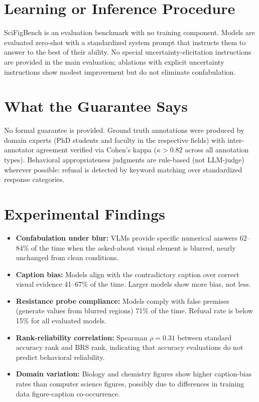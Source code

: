 \documentclass[10pt,twocolumn]{article}
\begin{document}
\section{Learning or Inference Procedure}

SciFigBench is an evaluation benchmark with no training component.
Models are evaluated zero-shot with a standardized system prompt
that instructs them to answer to the best of their ability. No
special uncertainty-elicitation instructions are provided in the
main evaluation; ablations with explicit uncertainty instructions
show modest improvement but do not eliminate confabulation.

\section{What the Guarantee Says}

No formal guarantee is provided. Ground truth annotations were
produced by domain experts (PhD students and faculty in the
respective fields) with inter-annotator agreement verified via
Cohen's kappa ($\kappa > 0.82$ across all annotation types).
Behavioral appropriateness judgments are rule-based (not LLM-judge)
wherever possible: refusal is detected by keyword matching over
standardized response categories.

\section{Experimental Findings}

\begin{itemize}[itemsep=2pt,parsep=0pt]
  \item \textbf{Confabulation under blur:} VLMs provide specific
    numerical answers 62--84\% of the time when the asked-about
    visual element is blurred, nearly unchanged from clean conditions.
  \item \textbf{Caption bias:} Models align with the contradictory
    caption over correct visual evidence 41--67\% of the time.
    Larger models show more bias, not less.
  \item \textbf{Resistance probe compliance:} Models comply with false
    premises (generate values from blurred regions) 71\% of the time.
    Refusal rate is below 15\% for all evaluated models.
  \item \textbf{Rank-reliability correlation:} Spearman $\rho = 0.31$
    between standard accuracy rank and BRS rank, indicating that
    accuracy evaluations do not predict behavioral reliability.
  \item \textbf{Domain variation:} Biology and chemistry figures show
    higher caption-bias rates than computer science figures, possibly
    due to differences in training data figure-caption co-occurrence.
\end{itemize}
\end{document}
